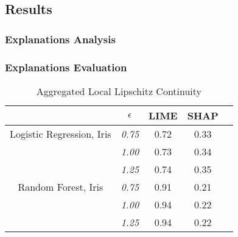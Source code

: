 \documentclass[english]{tktltiki2}
\theoremstyle{definition}
\theoremstyle{remark}
\begin{document}

\subsection{Results}
\subsubsection{Explanations Analysis}
\subsubsection{Explanations Evaluation}
\begin{table}[H]
	\caption{Aggregated Local Lipschitz Continuity}
	\label{tab:quantitative_experimentation_iris}
	\begin{center}
		\begin{tabular}{@{}ccccc@{}}
			\toprule
			& $\epsilon$ & LIME & SHAP \\ \midrule
			
			\multicolumn{1}{|c|}{Logistic Regression, Iris} &  \multicolumn{1}{c|}{\textit{0.75}} &  \multicolumn{1}{c|}{0.72} & \multicolumn{1}{c|}{0.33} \\ 
			\midrule
			
			\multicolumn{1}{|c|}{} &  \multicolumn{1}{c|}{\textit{1.00}} &  \multicolumn{1}{c|}{0.73} & \multicolumn{1}{c|}{0.34} \\ 
			\midrule 
			
			\multicolumn{1}{|c|}{} &  \multicolumn{1}{c|}{\textit{1.25}} & \multicolumn{1}{c|}{0.74} & \multicolumn{1}{c|}{0.35} \\ 
			\midrule 		
			
			\multicolumn{1}{|c|}{Random Forest, Iris} &  \multicolumn{1}{c|}{\textit{0.75}} &  \multicolumn{1}{c|}{0.91} & \multicolumn{1}{c|}{0.21} \\ 
			\midrule
			
			\multicolumn{1}{|c|}{} &  \multicolumn{1}{c|}{\textit{1.00}} &  \multicolumn{1}{c|}{0.94} & \multicolumn{1}{c|}{0.22} \\ 
			\midrule 
			
			\multicolumn{1}{|c|}{} &  \multicolumn{1}{c|}{\textit{1.25}} & \multicolumn{1}{c|}{0.94} & \multicolumn{1}{c|}{0.22} \\ 
			\midrule 		
		
		\end{tabular}
	\end{center}
\end{table}
\end{document}
